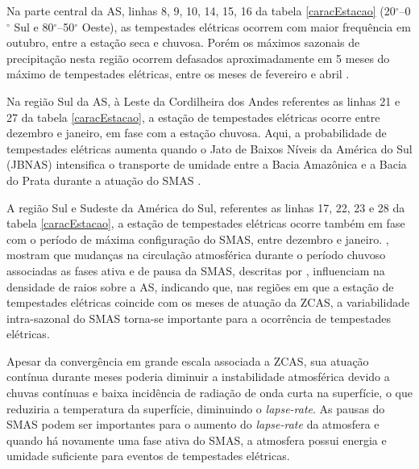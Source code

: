 Na parte central da AS, linhas  8, 9, 10, 14, 15, 16 da tabela \ref{caracEstacao} (20$^{\circ}$--0$^{\circ}$ Sul e 80$^{\circ}$--50$^{\circ}$ Oeste), as tempestades elétricas ocorrem com maior frequência em outubro, entre a estação seca e chuvosa. Porém os máximos sazonais de precipitação nesta região ocorrem defasados aproximadamente em 5 meses do máximo de tempestades elétricas, entre os meses de fevereiro e abril \cite{grimm2003nino,reboita2010regimes,shi-atlas,bombardi2008variabilidade,cusdodioTese}.


Na região Sul da AS, à Leste da Cordilheira dos Andes referentes as linhas  21 e 27 da tabela \ref{caracEstacao}, a estação de tempestades elétricas ocorre entre dezembro e janeiro, em fase com a estação chuvosa. Aqui, a probabilidade de tempestades elétricas aumenta quando o Jato de Baixos Níveis da América do Sul (JBNAS) intensifica o transporte de umidade entre a Bacia Amazônica e a Bacia do Prata durante a atuação do SMAS \cite{marengo2004}.   

A região Sul e Sudeste da América do Sul, referentes as linhas 17, 22, 23 e 28 da tabela \ref{caracEstacao}, a estação de tempestades elétricas ocorre também em fase com o período de máxima configuração do SMAS, entre dezembro e janeiro. , mostram que mudanças na circulação atmosférica durante o período chuvoso associadas as fases ativa e de pausa da SMAS, descritas por  , influenciam na densidade de raios sobre a AS,  indicando que, nas regiões em que a estação de tempestades elétricas coincide com os meses de  atuação da ZCAS, a variabilidade intra-sazonal do SMAS torna-se importante para a ocorrência de tempestades elétricas.

Apesar da convergência em grande escala associada a ZCAS, sua atuação contínua durante meses poderia diminuir a instabilidade atmosférica devido a chuvas contínuas e baixa incidência de radiação de onda curta na superfície, o que reduziria a temperatura da superfície, diminuindo o \textit{lapse-rate}. As pausas do SMAS podem ser importantes para o aumento do \textit{lapse-rate} da atmosfera e quando há novamente uma fase ativa do SMAS, a atmosfera possui energia e umidade suficiente para eventos de tempestades elétricas.


